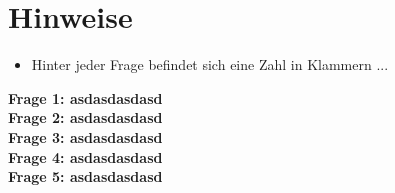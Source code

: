 \documentclass[10pt,a4paper]{article}
\begin{document}
\section*{Hinweise}
\begin{itemize}
\item Hinter jeder Frage befindet sich eine Zahl in Klammern ...
\end{itemize}
\textbf{Frage 1: asdasdasdasd}\\ 
\textbf{Frage 2: asdasdasdasd}\\ 
\textbf{Frage 3: asdasdasdasd}\\ 
\textbf{Frage 4: asdasdasdasd}\\ 
\textbf{Frage 5: asdasdasdasd}\\ 
\end{document}
